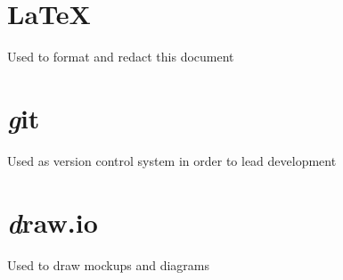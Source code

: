 \section{\LaTeX}
Used to format and redact this document
\section{\textit git}
Used as version control system in order to lead development
\section{\textit draw.io}
Used to draw mockups and diagrams